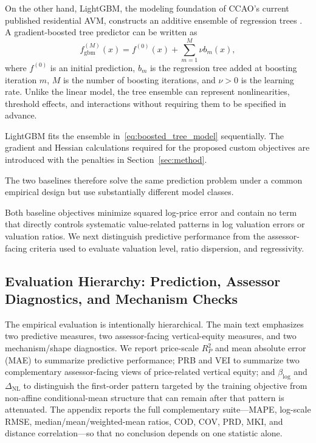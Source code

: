 \documentclass[10pt]{article}
\theoremstyle{definition}
\newcommand{\1}{\mathbf{1}}
\begin{document}
{On the other hand, LightGBM, the modeling foundation of CCAO's current published residential AVM, constructs an additive ensemble of regression trees \cite{CCAOModelResAVM2026,lightgbm}. A gradient-boosted tree predictor can be written as}
\begin{equation}
\label{eq:boosted_tree_model}
f_{\mathrm{gbm}}^{(M)}(x)
=
f^{(0)}(x)
+
\sum_{m=1}^{M}\nu b_m(x),
\end{equation}
where $f^{(0)}$ is an initial prediction, $b_m$ is the regression tree added at boosting iteration $m$, $M$ is the number of boosting iterations, and $\nu>0$ is the learning rate. Unlike the linear model, the tree ensemble can represent nonlinearities, threshold effects, and interactions without requiring them to be specified in advance.

LightGBM fits the ensemble in~\eqref{eq:boosted_tree_model} sequentially. The gradient and Hessian calculations required for the proposed custom objectives are introduced with the penalties in Section~\ref{sec:method}.

The two baselines therefore solve the same prediction problem under a common empirical design but use substantially different model classes.

{Both baseline objectives minimize squared log-price error and contain no term that directly controls systematic value-related patterns in log valuation errors or valuation ratios. We next distinguish predictive performance from the assessor-facing criteria used to evaluate valuation level, ratio dispersion, and regressivity.}


\subsection{Evaluation Hierarchy: Prediction, Assessor Diagnostics, and Mechanism Checks}
\label{subsec:metrics}

The empirical evaluation is intentionally hierarchical. The main text emphasizes two predictive measures, two assessor-facing vertical-equity measures, and two mechanism/shape diagnostics. We report price-scale $R^2_P$ and mean absolute error (MAE) to summarize predictive performance; PRB and VEI to summarize two complementary assessor-facing views of price-related vertical equity; and $\beta_{\log}$ and $\Delta_{\mathrm{NL}}$ to distinguish the first-order pattern targeted by the training objective from non-affine conditional-mean structure that can remain after that pattern is attenuated. The appendix reports the full complementary suite---MAPE, log-scale RMSE, median/mean/weighted-mean ratios, COD, COV, PRD, MKI, and distance correlation---so that no conclusion depends on one statistic alone.
\end{document}
